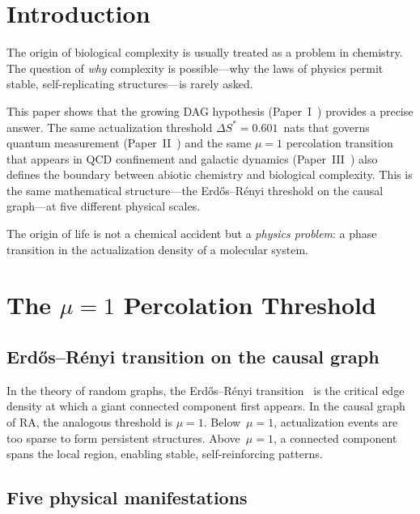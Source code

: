 \documentclass[11pt,a4paper]{article}
\theoremstyle{plain}
\theoremstyle{definition}
\theoremstyle{remark}
\begin{document}
\section{Introduction}\label{sec:intro}

The origin of biological complexity is usually treated as a problem in chemistry.
The question of \emph{why} complexity is possible---why the laws of physics permit
stable, self-replicating structures---is rarely asked.

This paper shows that the growing DAG hypothesis (Paper~I~\cite{P1}) provides a
precise answer.  The same actualization threshold $\Delta S^* = 0.601$~nats that
governs quantum measurement (Paper~II~\cite{P2}) and the same $\mu = 1$ percolation
transition that appears in QCD confinement and galactic dynamics
(Paper~III~\cite{P3}) also defines the boundary between abiotic chemistry and
biological complexity.  This is the same mathematical structure---the Erd\H{o}s--R\'enyi
threshold on the causal graph---at five different physical scales.

The origin of life is not a chemical accident but a \emph{physics problem}: a phase
transition in the actualization density of a molecular system.

\section{The $\mu = 1$ Percolation Threshold}\label{sec:threshold}

\subsection{Erd\H{o}s--R\'enyi transition on the causal graph}\label{sec:er}

In the theory of random graphs, the Erd\H{o}s--R\'enyi
transition~\cite{ErdosRenyi1960} is the critical edge density at which a giant
connected component first appears.  In the causal graph of RA, the analogous
threshold is $\mu = 1$.  Below~$\mu = 1$, actualization events are too sparse to
form persistent structures.  Above~$\mu = 1$, a connected component spans the local
region, enabling stable, self-reinforcing patterns.

\subsection{Five physical manifestations}\label{sec:five}
\end{document}
